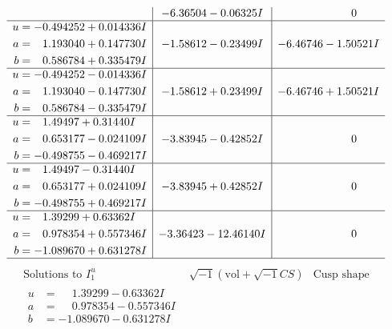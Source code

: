 \documentclass[1p]{elsarticle_modified}
\theoremstyle{definition}
\newcommand{\I}{\sqrt{-1}}
\begin{document}
$$\begin{array}{c|c|c}
 & -6.36504 - 0.06325 I & \phantom{-0.000000 } 0 \\ \hline\begin{aligned}
u &= -0.494252 + 0.014336 I \\
a &= \phantom{-}1.193040 + 0.147730 I \\
b &= \phantom{-}0.586784 + 0.335479 I\end{aligned}
 & -1.58612 - 0.23499 I & -6.46746 - 1.50521 I \\ \hline\begin{aligned}
u &= -0.494252 - 0.014336 I \\
a &= \phantom{-}1.193040 - 0.147730 I \\
b &= \phantom{-}0.586784 - 0.335479 I\end{aligned}
 & -1.58612 + 0.23499 I & -6.46746 + 1.50521 I \\ \hline\begin{aligned}
u &= \phantom{-}1.49497 + 0.31440 I \\
a &= \phantom{-}0.653177 - 0.024109 I \\
b &= -0.498755 - 0.469217 I\end{aligned}
 & -3.83945 - 0.42852 I & \phantom{-0.000000 } 0 \\ \hline\begin{aligned}
u &= \phantom{-}1.49497 - 0.31440 I \\
a &= \phantom{-}0.653177 + 0.024109 I \\
b &= -0.498755 + 0.469217 I\end{aligned}
 & -3.83945 + 0.42852 I & \phantom{-0.000000 } 0 \\ \hline\begin{aligned}
u &= \phantom{-}1.39299 + 0.63362 I \\
a &= \phantom{-}0.978354 + 0.557346 I \\
b &= -1.089670 + 0.631278 I\end{aligned}
 & -3.36423 - 12.46140 I & \phantom{-0.000000 } 0\\
 \hline 
 \end{array}$$\newpage$$\begin{array}{c|c|c}  
\text{Solutions to }I^u_{1}& \I (\text{vol} + \sqrt{-1}CS) & \text{Cusp shape}\\
 \hline 
\begin{aligned}
u &= \phantom{-}1.39299 - 0.63362 I \\
a &= \phantom{-}0.978354 - 0.557346 I \\
b &= -1.089670 - 0.631278 I\end{aligned}

\end{array}$$
\end{document}
